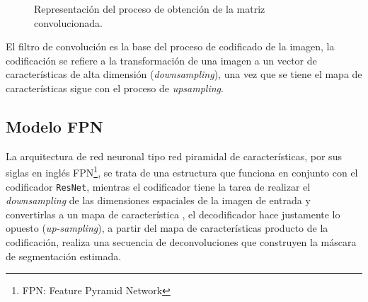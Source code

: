 \begin{figure}[b]
    \centering
    \caption{Representación del proceso de obtención de la matriz convolucionada.}
\end{figure}

El filtro de convolución es la base del proceso de codificado de la imagen, la codificación se refiere a la transformación de una imagen a un vector de características de alta dimensión (\emph{downsampling}), una vez que se tiene el mapa de características sigue con el proceso de \emph{upsampling}.

\subsection{Modelo FPN}
La arquitectura de red neuronal tipo red piramidal de características, por sus siglas en inglés FPN\footnote{FPN: Feature Pyramid Network}, se trata de una estructura que funciona en conjunto con el codificador \texttt{ResNet}, mientras el codificador tiene la tarea de realizar el \emph{downsampling} de las dimensiones espaciales de la imagen de entrada y convertirlas a un mapa de característica , el decodificador hace justamente lo opuesto (\emph{up-sampling}), a partir del mapa de características producto de la codificación, realiza una secuencia de deconvoluciones que construyen la máscara de segmentación estimada.

